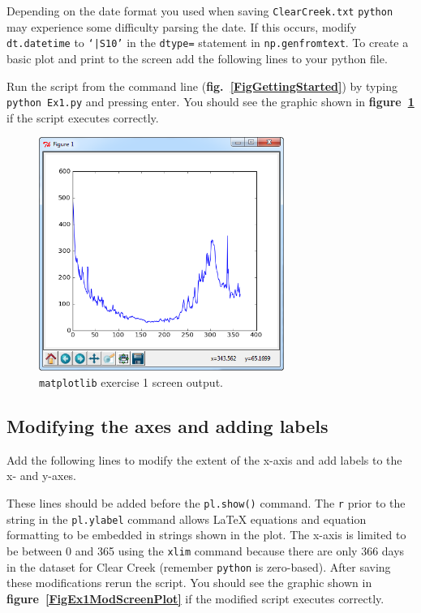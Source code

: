 \documentclass[12pt]{article}
\begin{document}
Depending on the date format you used when saving \texttt{ClearCreek.txt} \texttt{python} may experience some difficulty parsing the date. If this occurs, modify \texttt{dt.datetime} to \texttt{`|S10'} in the \texttt{dtype=} statement in \texttt{np.genfromtext}. To create a basic plot and print to the screen add the following lines to your python file. 

\begin{center}
	
\end{center}

Run the script from the command line (\textbf{fig.~\ref{FigGettingStarted}}) by typing \texttt{python Ex1.py} and pressing enter. You should see the graphic shown in \textbf{figure~\ref{FigEx1ScreenPlot}} if the script executes correctly.

\begin{figure}
	\centering
  	\includegraphics[height=3in]{figures/pl_PLOT.png}
 	\caption{\texttt{matplotlib} exercise 1 screen output.}
	\label{FigEx1ScreenPlot}
\end{figure}

\subsection{Modifying the axes and adding labels}
Add the following lines to modify the extent of the x-axis and add labels to the x- and y-axes.

\begin{center}
	
\end{center}

These lines should be added before the \texttt{pl.show()} command. The \texttt{r} prior to the string in the \texttt{pl.ylabel} command allows \LaTeX \hspace{1pt} equations and equation formatting to be embedded in strings shown in the plot. The x-axis is limited to be between 0 and 365 using the \texttt{xlim} command because there are only 366 days in the dataset for Clear Creek (remember \texttt{python} is zero-based). After saving these modifications rerun the script. You should see the graphic shown in  \textbf{figure~\ref{FigEx1ModScreenPlot}} if the modified script executes correctly.
\end{document}
